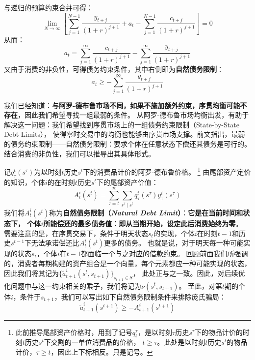\begin{example}
\begin{equation*}
    \end{equation*}
    与递归的预算约束合并可得：
    \begin{equation*}
        \lim_{N\rightarrow\infty} \left[\sum_{j=1}^{N-1}\frac{y_{t+j}}{\left(1+r\right)^{j+1}} + a_t 
            -\sum_{j=1}^{N-1}\frac{c_{t+j}}{\left(1+r\right)^{j+1}}\right] = 0
    \end{equation*}
    从而：
    \begin{equation*}
        a_t = \sum_{j=1}^{\infty}\frac{c_{t+j}}{\left(1+r\right)^{j+1}} - \sum_{j=1}^{\infty}\frac{y_{t+j}}{\left(1+r\right)^{j+1}}
    \end{equation*}
    又由于消费的非负性，可得债务约束条件，其中右侧即为\textbf{自然债务限制}：
    \begin{equation*}
        a_t \geq -\sum_{j=1}^{\infty}\frac{y_{t+j}}{\left(1+r\right)^{j+1}}
    \end{equation*}
\end{example}

我们已经知道：\textbf{与阿罗-德布鲁市场不同，如果不施加额外约束，序贯均衡可能不存在}，因此我们希望寻找一组最弱的条件。
从阿罗-德布鲁市场均衡出发，有助于解决这一问题：我们希望找到序贯市场上的一组债务约束限制（State-by-State Debt Limits），
使得零时交易中的均衡也能够由序贯市场支撑。前文指出，最弱的债务约束限制——自然债务限制：要求个体在任意状态下偿还其债务是可行的。
结合消费的非负性，我们可以推导出其具体形式。

记$q_{\tau}^t\left(s^{\tau}\right)$为以时刻$t$历史$s^t$下的消费品计价的阿罗-德布鲁价格。
\footnote{此前推导尾部资产价格时，用到了记号$q_t^{\tau}$，是以时刻$\tau$历史$s^{\tau}$下的物品计价的时刻$t$历史$s^t$下交割的一单位消费品的价格，
$t\geq\tau$。此处是以时刻$t$历史$s^t$的物品计价，$\tau\geq t$，因此上下标相反。只是记号。}
由尾部资产定价的知识，个体$i$的在时刻$t$历史$s^t$下的尾部资产价值：
\begin{equation}    \label{eq-sq-nature-debt}
    A_t^i\left(s^t\right)=\sum_{\tau=t}^{\infty} \sum_{s^\tau \mid s^t} q_\tau^t\left(s^\tau\right) y_\tau^i\left(s^\tau\right)
\end{equation}
我们将$A_t^i\left(s^t\right)$称为\textbf{自然债务限制（\textit{Natural Debt Limit}）}：\textbf{它是在当前时间和状态下，
个体$i$所能偿还的最多债务值：即从当期开始，设定此后消费始终为零}。
需要注意的是，在序贯交易下，条件于明天状态$s_t$的实现，个体$i$在时刻$t-1$和历史$s^{t-1}$下无法承诺偿还比$A_t^i\left(s^t\right)$更多的债务。
也就是说，对于明天每一种可能实现的状态$s_t$，个体$i$在$t-1$都面临一个与之对应的借款约束。
回顾前面我们所强调的，消费者每期构建的资产组合是一个向量，每个元素都应一种可能实现的状态，
因此我们将其记为$\{\tilde{a}_{t+1}^i\left(s^t,s_{t+1}\right)\}_{s_{t+1}\in S}$，
此处正与之一致。因此，对后续优化问题中与这一约束相关的乘子，我们将记为$\nu\left(s^t,s_{t+1}\right)$。
至此，对第$t$期的个体$i$，条件于$s_{t+1}$，我们可以写出如下自然债务限制条件来排除庞氏骗局：
\begin{equation}    \label{eq-sq-natural-debt-c}
    \tilde{a}_{t+1}^i\left(s^{t+1}\right) \geq -A_{t+1}^i\left(s^{t+1}\right)
\end{equation}

